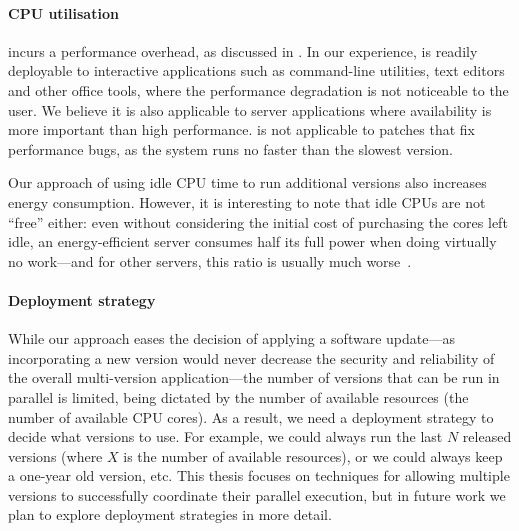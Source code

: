 
\paragraph{CPU utilisation} \mx incurs a performance overhead, as discussed in
.  In our experience, \mx is readily deployable to
interactive applications such as command-line utilities, text editors and other
office tools, where the performance degradation is not noticeable to the user.
We believe it is also applicable to server applications where availability is
more important than high performance.  \mx is not applicable to patches that
fix performance bugs, as the system runs no faster than the slowest
version.

Our approach of using idle CPU time to run additional versions also increases
energy consumption.  However, it is interesting to note that idle CPUs are not
``free'' either: even without considering the initial cost of purchasing the
cores left idle, an energy-efficient server consumes half its full power when
doing virtually no work---and for other servers, this ratio is usually much
worse~\cite{barroso2007}.

\paragraph{Deployment strategy} While our approach eases the decision of
applying a software update---as incorporating a new version would never
decrease the security and reliability of the overall multi-version
application---the number of versions that can be run in parallel is limited,
being dictated by the number of available resources (\eg the number of
available CPU cores).  As a result, we need a deployment strategy to decide
what versions to use.  For example, we could always run the last $N$ released
versions (where $X$ is the number of available resources), or we could always
keep a one-year old version, etc.  This thesis focuses on techniques for
allowing multiple versions to successfully coordinate their parallel execution,
but in future work we plan to explore deployment strategies in more detail.
